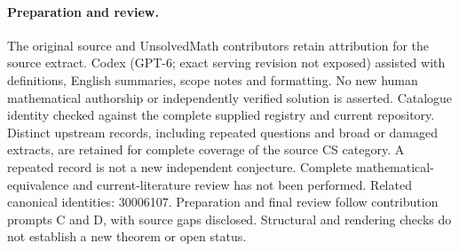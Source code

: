 \documentclass[11pt]{article}
\begin{document}
\paragraph{Preparation and review.}
The original source and UnsolvedMath contributors retain attribution for the source extract. Codex (GPT-6; exact serving revision not exposed) assisted with definitions, English summaries, scope notes and formatting. No new human mathematical authorship or independently verified solution is asserted. Catalogue identity checked against the complete supplied registry and current repository. Distinct upstream records, including repeated questions and broad or damaged extracts, are retained for complete coverage of the source CS category. A repeated record is not a new independent conjecture. Complete mathematical-equivalence and current-literature review has not been performed. Related canonical identities: 30006107. Preparation and final review follow contribution prompts C and D, with source gaps disclosed. Structural and rendering checks do not establish a new theorem or open status.
\label{end:statement}
\end{document}
